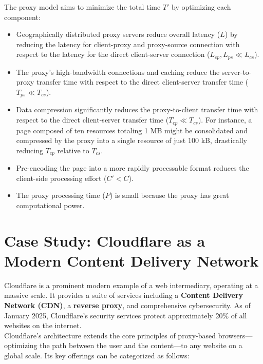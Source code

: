 \documentclass{scrbook}
\begin{document}
The proxy model aims to minimize the total time $T'$ by optimizing each component:

\begin{itemize}
    \item Geographically distributed proxy servers reduce overall latency ($L$) by reducing the latency for client-proxy and proxy-source connection with respect to the latency for the direct client-server connection ($L_{cp}, L_{ps} \ll L_{cs}$).
    
    \item The proxy's high-bandwidth connections and caching reduce the server-to-proxy transfer time with respect to the direct client-server transfer time ($T_{ps} \ll T_{cs}$).
    
    \item Data compression significantly reduces the proxy-to-client transfer time with respect to the direct client-server transfer time ($T_{cp} \ll T_{cs}$). For instance, a page composed of ten resources totaling 1 MB might be consolidated and compressed by the proxy into a single resource of just 100 kB, drastically reducing $T_{cp}$ relative to $T_{cs}$.
    
    \item Pre-encoding the page into a more rapidly processable format reduces the client-side processing effort ($C' < C$).

    \item The proxy processing time ($P$) is small because the proxy has great computational power.
\end{itemize}

\section{Case Study: Cloudflare as a Modern Content Delivery Network}

Cloudflare is a prominent modern example of a web intermediary, operating at a massive scale. It provides a suite of services including a \textbf{Content Delivery Network (CDN)}, a \textbf{reverse proxy}, and comprehensive cybersecurity. As of January 2025, Cloudflare's security services protect approximately 20\% of all websites on the internet. \\

Cloudflare's architecture extends the core principles of proxy-based browsers—optimizing the path between the user and the content—to any website on a global scale. Its key offerings can be categorized as follows:
\end{document}
